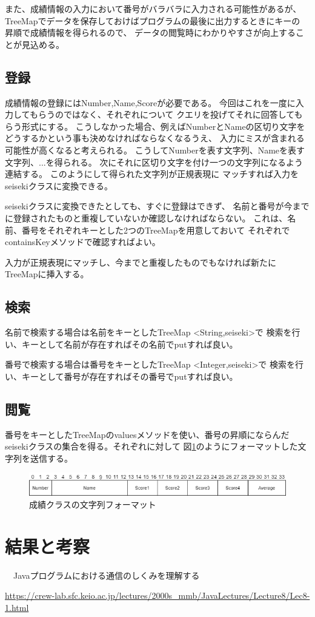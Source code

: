 \documentclass[dvipdfmx]{jsarticle}
\begin{document}
また、成績情報の入力において番号がバラバラに入力される可能性があるが、
TreeMapでデータを保存しておけばプログラムの最後に出力するときにキーの
昇順で成績情報を得られるので、
データの閲覧時にわかりやすさが向上することが見込める。

\subsection{登録}
成績情報の登録にはNumber,Name,Scoreが必要である。
今回はこれを一度に入力してもらうのではなく、それぞれについて
クエリを投げてそれに回答してもらう形式にする。
こうしなかった場合、例えばNumberとNameの区切り文字を
どうするかという事も決めなければならなくなるうえ、
入力にミスが含まれる可能性が高くなると考えられる。
こうしてNumberを表す文字列、Nameを表す文字列、...を得られる。
次にそれに区切り文字を付け一つの文字列になるよう連結する。
このようにして得られた文字列が正規表現に
マッチすれば入力をseisekiクラスに変換できる。

seisekiクラスに変換できたとしても、すぐに登録はできず、
名前と番号が今までに登録されたものと重複していないか確認しなければならない。
これは、名前、番号をそれぞれキーとした2つのTreeMapを用意しておいて
それぞれでcontainsKeyメソッドで確認すればよい。

入力が正規表現にマッチし、今までと重複したものでもなければ新たに
TreeMapに挿入する。

\subsection{検索}
名前で検索する場合は名前をキーとしたTreeMap \textless String,seiseki\textgreater で
検索を行い、キーとして名前が存在すればその名前でputすれば良い。

番号で検索する場合は番号をキーとしたTreeMap \textless Integer,seiseki\textgreater で
検索を行い、キーとして番号が存在すればその番号でputすれば良い。

\subsection{閲覧}
番号をキーとしたTreeMapのvaluesメソッドを使い、番号の昇順にならんだ
seisekiクラスの集合を得る。それぞれに対して
図\ref{seiseki_format}のようにフォーマットした文字列を送信する。
\begin{figure}[H]
  \centering
  \includegraphics[width=0.9\hsize]{../pic/seiseki_format.png}
  \caption{成績クラスの文字列フォーマット}
  \label{seiseki_format}
\end{figure}



\section{結果と考察}

\begin{thebibliography}{10}
  　Javaプログラムにおける通信のしくみを理解する

  \url{https://crew-lab.sfc.keio.ac.jp/lectures/2000s_mmb/JavaLectures/Lecture8/Lec8-1.html}
\end{thebibliography}
\end{document}
